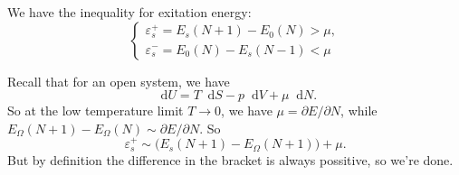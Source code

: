 \documentclass[b5paper,10pt,UTF8]{book}
\newcommand*\dd{\mathop{}\!\mathrm{d}}
\numberwithin{equation}{section}
\begin{document}
		\begin{Proposition}
			We have the inequality for exitation energy:
			\begin{equation}\label{2.4.3}
				\begin{cases}
					\varepsilon_s^+=E_s(N+1)-E_0(N)>\mu,\\
					\varepsilon_s^-=E_0(N)-E_s(N-1)<\mu
				\end{cases}
			\end{equation}
		\end{Proposition}
		\begin{Proof}				
			Recall that for an open system, we have 
			\begin{equation}\label{2.4.4}
			\dd U=T\dd S-p\dd V+\mu\dd N.
			\end{equation}
			So at the low temperature limit $T\rightarrow0$, we have 
			$\mu=\partial E/\partial N$, while $E_\Omega(N+1)-E_\Omega(N)\sim\partial E/\partial N$. So
			$$\varepsilon_s^+\sim\bigg(E_s(N+1)-E_\Omega(N+1)\bigg)+\mu.$$
			But by definition the difference in the bracket is always possitive, so we're done.
		\end{Proof}
\end{document}
